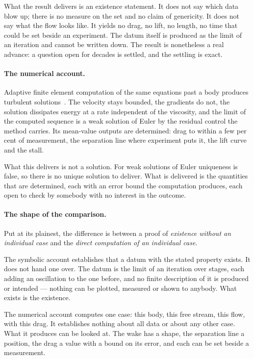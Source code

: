 \documentclass[11pt]{article}
\begin{document}
What the result delivers is an existence statement. It does not say which data blow up; there is no
measure on the set and no claim of genericity. It does not say what the flow looks like. It yields
no drag, no lift, no length, no time that could be set beside an experiment. The datum itself is
produced as the limit of an iteration and cannot be written down. The result is nonetheless a real
advance: a question open for decades is settled, and the settling is exact.

\paragraph{The numerical account.} Adaptive finite element computation of the same equations past a
body produces turbulent solutions~\cite{book,dalembert,flight}. The velocity stays bounded, the
gradients do not, the solution dissipates energy at a rate independent of the viscosity, and the
limit of the computed sequence is a weak solution of Euler by the residual control the method
carries. Its mean-value outputs are determined: drag to within a few per cent of measurement, the
separation line where experiment puts it, the lift curve and the stall.

What this delivers is not a solution. For weak solutions of Euler uniqueness is false, so there is no
unique solution to deliver. What is delivered is the quantities that are determined, each with an
error bound the computation produces, each open to check by somebody with no interest in the outcome.

\paragraph{The shape of the comparison.} Put at its plainest, the difference is between a proof of
\emph{existence without an individual case} and the \emph{direct computation of an individual case}.

The symbolic account establishes that a datum with the stated property exists. It does not hand one
over. The datum is the limit of an iteration over stages, each adding an oscillation to the one
before, and no finite description of it is produced or intended --- nothing can be plotted, measured
or shown to anybody. What exists is the existence.

The numerical account computes one case: this body, this free stream, this flow, with this drag. It
establishes nothing about all data or about any other case. What it produces can be looked at. The
wake has a shape, the separation line a position, the drag a value with a bound on its error, and
each can be set beside a measurement.
\end{document}
